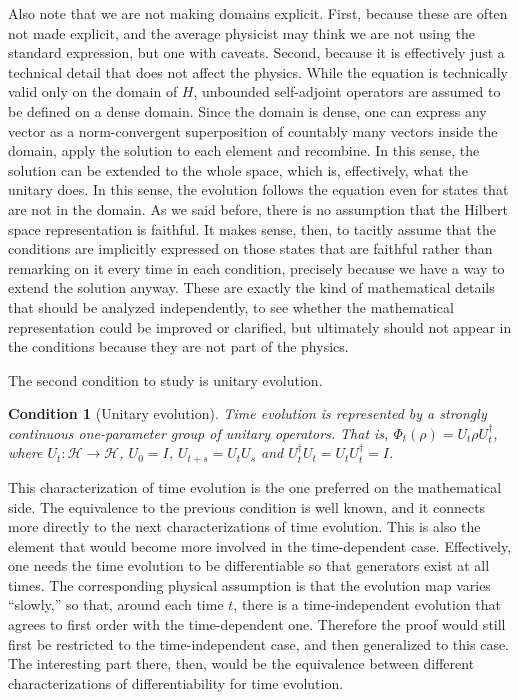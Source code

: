 \documentclass[entropy,article,submit,moreauthors]{Definitions/mdpi}
\newtheorem{condth}{Condition}
\renewcommand*{\thecondth}{\Roman{condth}}
\newenvironment{condition}[2][]{\renewcommand{\thecondth}{#2}\begin{condth}[#1]\label{#2}}{\end{condth}\renewcommand{\thecondth}{\Roman{condth}}}
\begin{document}
Also note that we are not making domains explicit. First, because these are often not made explicit, and the average physicist may think we are not using the standard expression, but one with caveats. Second, because it is effectively just a technical detail that does not affect the physics. While the equation is technically valid only on the domain of $H$, unbounded self-adjoint operators are assumed to be defined on a dense domain. Since the domain is dense, one can express any vector as a norm-convergent superposition of countably many vectors inside the domain, apply the solution to each element and recombine. In this sense, the solution can be extended to the whole space, which is, effectively, what the unitary does. In this sense, the evolution follows the equation even for states that are not in the domain. As we said before, there is no assumption that the Hilbert space representation is faithful. It makes sense, then, to tacitly assume that the conditions are implicitly expressed on those states that are faithful rather than remarking on it every time in each condition, precisely because we have a way to extend the solution anyway. These are exactly the kind of mathematical details that should be analyzed independently, to see whether the mathematical representation could be improved or clarified, but ultimately should not appear in the conditions because they are not part of the physics.

The second condition to study is unitary evolution.
\begin{condition}[Unitary evolution]{DR-UNIT}
	Time evolution is represented by a strongly continuous one-parameter group of unitary operators. That is, $\Phi_t(\rho)=U_t\rho U_t^\dagger$, where $U_t:\mathcal{H}\to\mathcal{H}$, $U_0=I$, $U_{t+s}=U_tU_s$ and $U_t^\dagger U_t=U_tU_t^\dagger=I$.
\end{condition}
This characterization of time evolution is the one preferred on the mathematical side. The equivalence to the previous condition is well known, and it connects more directly to the next characterizations of time evolution. This is also the element that would become more involved in the time-dependent case. Effectively, one needs the time evolution to be differentiable so that generators exist at all times. The corresponding physical assumption is that the evolution map varies ``slowly,'' so that, around each time $t$, there is a time-independent evolution that agrees to first order with the time-dependent one. Therefore the proof would still first be restricted to the time-independent case, and then generalized to this case. The interesting part there, then, would be the equivalence between different characterizations of differentiability for time evolution.
\end{document}
